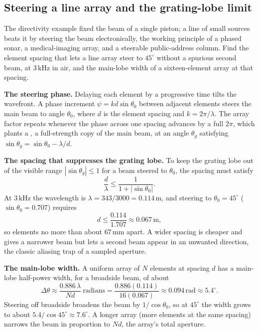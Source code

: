 \subsection{Steering a line array and the grating-lobe limit}

The directivity example fixed the beam of a single piston; a line of small
sources beats it by steering the beam electronically, the working principle
of a phased sonar, a medical-imaging array, and a steerable public-address
column. Find the element spacing that lets a line array steer to
$45^{\circ}$ without a spurious second beam, at $3\,\si{\kilo\hertz}$ in
air, and the main-lobe width of a sixteen-element array at that spacing.

\textbf{The steering phase.} Delaying each element by a progressive time
tilts the wavefront. A phase increment $\psi = kd\sin\theta_0$ between
adjacent elements steers the main beam to angle $\theta_0$, where $d$ is the
element spacing and $k=2\pi/\lambda$. The array factor repeats whenever the
phase across one spacing advances by a full $2\pi$, which plants a
, a full-strength copy of the main beam, at an angle
$\theta_g$ satisfying $\sin\theta_g = \sin\theta_0 - \lambda/d$.

\textbf{The spacing that suppresses the grating lobe.} To keep the grating
lobe out of the visible range $|\sin\theta_g|\le 1$ for a beam steered to
$\theta_0$, the spacing must satisfy
\[
\frac{d}{\lambda} \le \frac{1}{1+|\sin\theta_0|}.
\]
At $3\,\si{\kilo\hertz}$ the wavelength is $\lambda = 343/3000 =
0.114\,\si{\meter}$, and steering to $\theta_0 = 45^{\circ}$
($\sin\theta_0 = 0.707$) requires
\[
d \le \frac{0.114}{1.707} \approx 0.067\,\si{\meter},
\]
so elements no more than about $67\,\si{\milli\meter}$ apart. A wider
spacing is cheaper and gives a narrower beam but lets a second beam appear
in an unwanted direction, the classic aliasing trap of a sampled aperture.

\textbf{The main-lobe width.} A uniform array of $N$ elements at spacing $d$
has a main-lobe half-power width, for a broadside beam, of about
\[
\Delta\theta \approx \frac{0.886\,\lambda}{Nd}\ \text{radians}
             = \frac{0.886(0.114)}{16(0.067)}
             \approx 0.094\,\text{rad} \approx 5.4^{\circ}.
\]
Steering off broadside broadens the beam by $1/\cos\theta_0$, so at
$45^{\circ}$ the width grows to about $5.4/\cos 45^{\circ}\approx
7.6^{\circ}$. A longer array (more elements at the same spacing) narrows the
beam in proportion to $Nd$, the array's total aperture.

